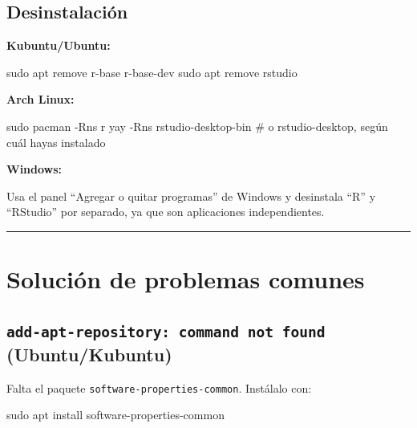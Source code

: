 \documentclass[
  man,
  floatsintext,
  longtable,
  a4paper,
  nolmodern,
  notxfonts,
  notimes,
  12pt,
  colorlinks=true,linkcolor=blue,citecolor=blue,urlcolor=blue]{apa7}
\newenvironment{Shaded}{\begin{snugshade}}{\end{snugshade}}
\newcommand{\AttributeTok}[1]{\textcolor[rgb]{0.40,0.45,0.13}{#1}}
\newcommand{\CommentTok}[1]{\textcolor[rgb]{0.37,0.37,0.37}{#1}}
\newcommand{\ExtensionTok}[1]{\textcolor[rgb]{0.00,0.23,0.31}{#1}}
\newcommand{\FunctionTok}[1]{\textcolor[rgb]{0.28,0.35,0.67}{#1}}
\newcommand{\NormalTok}[1]{\textcolor[rgb]{0.00,0.23,0.31}{#1}}
\begin{document}
\subsection{Desinstalación}\label{desinstalaciuxf3n}

\textbf{Kubuntu/Ubuntu:}

\begin{Shaded}
\begin{Highlighting}[]
\FunctionTok{sudo}\NormalTok{ apt remove r{-}base r{-}base{-}dev}
\FunctionTok{sudo}\NormalTok{ apt remove rstudio}
\end{Highlighting}
\end{Shaded}

\textbf{Arch Linux:}

\begin{Shaded}
\begin{Highlighting}[]
\FunctionTok{sudo}\NormalTok{ pacman }\AttributeTok{{-}Rns}\NormalTok{ r}
\ExtensionTok{yay} \AttributeTok{{-}Rns}\NormalTok{ rstudio{-}desktop{-}bin   }\CommentTok{\# o rstudio{-}desktop, según cuál hayas instalado}
\end{Highlighting}
\end{Shaded}

\textbf{Windows:}

Usa el panel ``Agregar o quitar programas'' de Windows y desinstala
``R'' y ``RStudio'' por separado, ya que son aplicaciones
independientes.

\begin{center}\rule{0.5\linewidth}{0.5pt}\end{center}

\section{Solución de problemas
comunes}\label{soluciuxf3n-de-problemas-comunes}

\subsection{\texorpdfstring{\texttt{add-apt-repository:\ command\ not\ found}
(Ubuntu/Kubuntu)}{add-apt-repository: command not found (Ubuntu/Kubuntu)}}\label{add-apt-repository-command-not-found-ubuntukubuntu}

Falta el paquete \texttt{software-properties-common}. Instálalo con:

\begin{Shaded}
\begin{Highlighting}[]
\FunctionTok{sudo}\NormalTok{ apt install software{-}properties{-}common}
\end{Highlighting}
\end{Shaded}
\end{document}
